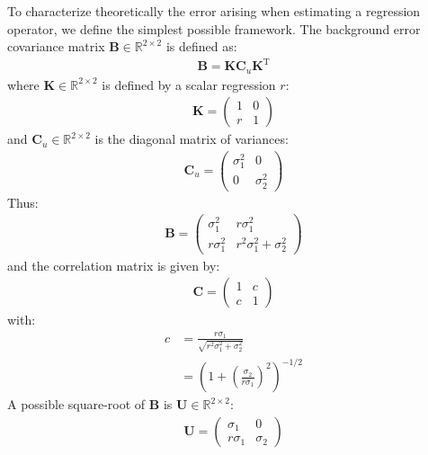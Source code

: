 \documentclass[12pt]{scrartcl}
\begin{document}
To characterize theoretically the error arising when estimating a regression operator, we define the simplest possible framework. The background error covariance matrix $\mathbf{B} \in \mathbb{R}^{2 \times 2}$ is defined as:
\begin{align}
\mathbf{B} = \mathbf{K} \mathbf{C}_u \mathbf{K}^\mathrm{T}
\end{align}
where $\mathbf{K} \in \mathbb{R}^{2 \times 2}$ is defined by a scalar regression $r$:
\begin{align}
\mathbf{K} = \left( \begin{array}{cc}
1 & 0 \\
r & 1
\end{array} \right)
\end{align}
and $\mathbf{C}_u \in \mathbb{R}^{2 \times 2}$ is the diagonal matrix of variances:
\begin{align}
\mathbf{C}_u = \left( \begin{array}{cc}
\sigma_1^2 & 0 \\
0 & \sigma_2^2
\end{array} \right)
\end{align}
Thus:
\begin{align}
\mathbf{B} = \left( \begin{array}{cc}
\sigma_1^2 & r \sigma_1^2\\
r \sigma_1^2 & r^2 \sigma_1^2 + \sigma_2^2
\end{array} \right)
\end{align}
and the correlation matrix is given by:
\begin{align}
\mathbf{C} = \left( \begin{array}{cc}
1 & c\\
c & 1
\end{array} \right)
\end{align}
with:
\begin{align}
\label{eq:correlation}
c & = \frac{r \sigma_1}{\sqrt{r^2 \sigma_1^2 + \sigma_2^2}} \nonumber \\
& = \left(1 + \left(\displaystyle \frac{\sigma_2}{r \sigma_1}\right)^2\right)^{-1/2}
\end{align}
A possible square-root of $\mathbf{B}$ is $\mathbf{U} \in \mathbb{R}^{2 \times 2}$:
\begin{align}
\mathbf{U} = \left( \begin{array}{cc}
\sigma_1 & 0 \\
r \sigma_1 & \sigma_2
\end{array} \right)
\end{align}
\end{document}
